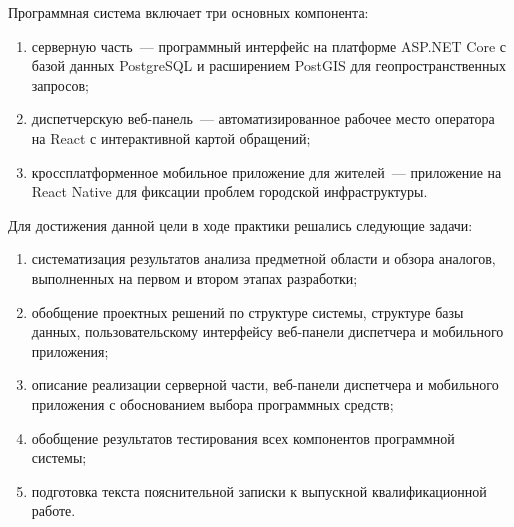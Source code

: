 Программная система включает три основных компонента:
\begin{enumerate}
    \item серверную часть~--- программный интерфейс на платформе ASP.NET Core с базой
          данных PostgreSQL и расширением PostGIS для геопространственных запросов;
    \item диспетчерскую веб-панель~--- автоматизированное рабочее место оператора
          на React с интерактивной картой обращений;
    \item кроссплатформенное мобильное приложение для жителей~--- приложение на
          React Native для фиксации проблем городской инфраструктуры.
\end{enumerate}

Для достижения данной цели в ходе практики решались следующие задачи:
\begin{enumerate}
    \item систематизация результатов анализа предметной области и обзора аналогов,
          выполненных на первом и втором этапах разработки;
    \item обобщение проектных решений по структуре системы, структуре базы данных,
          пользовательскому интерфейсу веб-панели диспетчера и мобильного приложения;
    \item описание реализации серверной части, веб-панели диспетчера и мобильного
          приложения с обоснованием выбора программных средств;
    \item обобщение результатов тестирования всех компонентов программной системы;
    \item подготовка текста пояснительной записки к выпускной квалификационной работе.
\end{enumerate}
